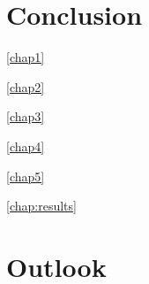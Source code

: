 \section{Conclusion}

\cref{chap1}

\cref{chap2}

\cref{chap3}

\cref{chap4}

\cref{chap5}

\cref{chap:results}

\section{Outlook}
